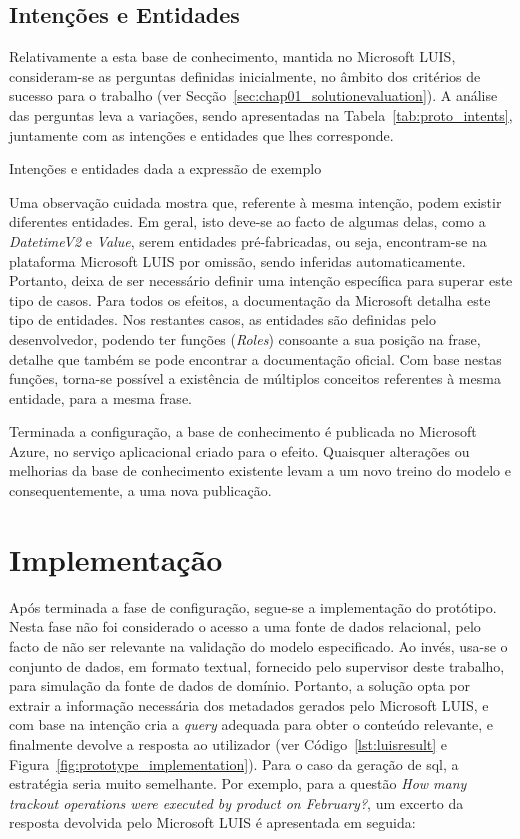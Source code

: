 \subsection{Intenções e Entidades}
Relativamente a esta base de conhecimento, mantida no Microsoft LUIS, consideram-se as perguntas definidas inicialmente, no âmbito dos critérios de sucesso para o trabalho (ver Secção~\ref{sec:chap01_solutionevaluation}). A análise das perguntas leva a variações, sendo apresentadas na Tabela~\ref{tab:proto_intents}, juntamente com as intenções e entidades que lhes corresponde.
%
\begin{table}
\caption{Intenções e entidades dada a expressão de exemplo}
\label{tab:proto_intents}
\centering
\resizebox{\textwidth}{!}{
\renewcommand{\arraystretch}{1.3}
\footnotesize

}
\end{table}
%
Uma observação cuidada mostra que, referente à mesma intenção, podem existir diferentes entidades. Em geral, isto deve-se ao facto de algumas delas, como a \textit{DatetimeV2} e \textit{Value}, serem entidades pré-fabricadas, ou seja, encontram-se na plataforma Microsoft LUIS por omissão, sendo inferidas automaticamente. Portanto, deixa de ser necessário definir uma intenção específica para superar este tipo de casos. Para todos os efeitos, a documentação da Microsoft detalha este tipo de entidades. Nos restantes casos, as entidades são definidas pelo desenvolvedor, podendo ter funções (\textit{Roles}) consoante a sua posição na frase, detalhe que também se pode encontrar a documentação oficial. Com base nestas funções, torna-se possível a existência de múltiplos conceitos referentes à mesma entidade, para a mesma frase.

Terminada a configuração, a base de conhecimento é publicada no Microsoft Azure, no serviço aplicacional criado para o efeito. Quaisquer alterações ou melhorias da base de conhecimento existente levam a um novo treino do modelo e consequentemente, a uma nova publicação.

\section{Implementação}
\label{sec:chap05_prototypeimplementation}
Após terminada a fase de configuração, segue-se a implementação do protótipo. Nesta fase não foi considerado o acesso a uma fonte de dados relacional, pelo facto de não ser relevante na validação do modelo especificado. Ao invés, usa-se o conjunto de dados, em formato textual, fornecido pelo supervisor deste trabalho, para simulação da fonte de dados de domínio. Portanto, a solução opta por extrair a informação necessária dos metadados gerados pelo Microsoft LUIS, e com base na intenção cria a \textit{query} adequada para obter o conteúdo relevante, e finalmente devolve a resposta ao utilizador (ver Código~\ref{lst:luisresult} e Figura~\ref{fig:prototype_implementation}). Para o caso da geração de \gls{sql}, a estratégia seria muito semelhante. Por exemplo, para a questão \textit{How many trackout operations were executed by product on February?}, um excerto da resposta devolvida pelo Microsoft LUIS é apresentada em seguida:

